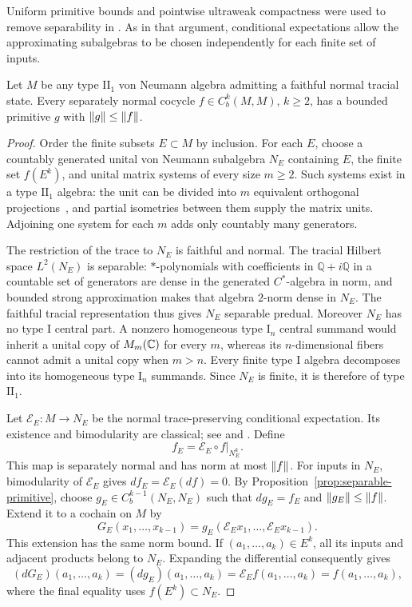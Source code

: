 Uniform primitive bounds and pointwise ultraweak compactness were
used to remove separability in \cite[Section~7]{CPSS2003}.
As in that argument, conditional expectations allow the approximating subalgebras
to be chosen independently for each finite set of inputs.

\begin{proposition}\label{prop:tracial-primitive}
Let $M$ be any type $\mathrm{II}_1$ von Neumann algebra admitting a
faithful normal tracial state.  Every separately normal cocycle
$f\in C_b^k(M,M)$, $k\ge2$, has a bounded primitive $g$ with
$\lVert g\rVert\le\lVert f\rVert$.
\end{proposition}

\begin{proof}
Order the finite subsets $E\subset M$ by inclusion.  For each $E$,
choose a countably generated unital von Neumann subalgebra $N_E$
containing $E$, the finite set $f(E^k)$, and unital matrix systems
of every size $m\ge2$.  Such systems exist in a type $\mathrm{II}_1$
algebra: the unit can be divided into $m$ equivalent orthogonal
projections~\cite[Examples~III.2.5.4(iii)]{Blackadar2006}, and partial isometries between them supply the matrix
units.  Adjoining one system for each $m$ adds only countably many
generators.

The restriction of the trace to $N_E$ is faithful and normal.  The
tracial Hilbert space $L^2(N_E)$ is separable: $*$-polynomials with
coefficients in $\mathbb Q+i\mathbb Q$ in a countable set of generators are dense in the
generated $C^*$-algebra in norm, and bounded strong approximation
makes that algebra $2$-norm dense in $N_E$.  The faithful tracial
representation thus gives $N_E$ separable predual.  Moreover $N_E$
has no type I central part.  A nonzero homogeneous type $\mathrm{I}_n$
central summand would inherit a unital copy of $M_m(\mathbb C)$ for every
$m$, whereas its $n$-dimensional fibers cannot admit a unital copy
when $m>n$.  Every finite type I algebra decomposes into its
homogeneous type $\mathrm{I}_n$ summands.  Since $N_E$ is finite,
it is therefore of type $\mathrm{II}_1$.

Let $\mathcal E_E:M\to N_E$ be the normal trace-preserving
conditional expectation. Its existence and bimodularity are classical;
see \cite[Th\'eor\`eme~8]{Dixmier1953} and
\cite[Theorem~1]{Umegaki1954}. Define
\[
 f_E=\mathcal E_E\circ f\big|_{N_E^k}.
\]
This map is separately normal and has norm at most $\lVert f\rVert$.
For inputs in $N_E$, bimodularity of $\mathcal E_E$ gives
$df_E=\mathcal E_E(df)=0$.  By
Proposition~\ref{prop:separable-primitive}, choose
$g_E\in C_b^{k-1}(N_E,N_E)$ such that
$dg_E=f_E$ and $\lVert g_E\rVert\le\lVert f\rVert$.  Extend it to a cochain on
$M$ by
\[
 G_E(x_1,\ldots,x_{k-1})
 =g_E(\mathcal E_Ex_1,\ldots,\mathcal E_Ex_{k-1}).
\]
This extension has the same norm bound.  If
$(a_1,\ldots,a_k)\in E^k$, all its inputs and adjacent products
belong to $N_E$.  Expanding the differential consequently gives
\begin{equation}\label{eq:finite-set-exactness}
 (dG_E)(a_1,\ldots,a_k)
 =(dg_E)(a_1,\ldots,a_k)
 =\mathcal E_Ef(a_1,\ldots,a_k)
 =f(a_1,\ldots,a_k),
\end{equation}
where the final equality uses $f(E^k)\subset N_E$.


\end{proof}
